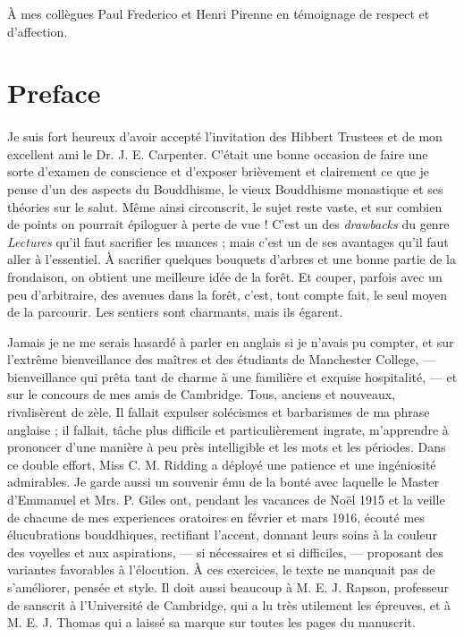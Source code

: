 \documentclass[a4paper, 11pt, oneside, english]{article}
\begin{document}
\setlength{\parskip}{1mm plus1mm minus1mm}
\clearpage
\tableofcontents
\clearpage
\vspace*{\fill}
\begin{center}\footnotesize
À mes collègues Paul Frederico et Henri Pirenne en témoignage de respect et d'affection.
\end{center}
\vspace*{\fill} 
\clearpage
\section*{Preface}
\paragraph{}
Je suis fort heureux d'avoir accepté l'invitation des Hibbert Trustees et de mon excellent ami le Dr. J. E. Carpenter. C'était une bonne occasion de faire une sorte d'examen de conscience et d'exposer brièvement et clairement ce que je pense d'un des aspects du Bouddhisme, le vieux Bouddhisme monastique et ses théories sur le salut. Même ainsi circonscrit, le sujet reste vaste, et sur combien de points on pourrait épiloguer à perte de vue ! C'est un des \emph{drawbacks} du genre \emph{Lectures} qu'il faut sacrifier les nuances ; mais c'est un de ses avantages qu'il faut aller à l'essentiel. À sacrifier quelques bouquets d'arbres et une bonne partie de la frondaison, on obtient une meilleure idée de la forêt. Et couper, parfois avec un peu d'arbitraire, des avenues dans la forêt, c'est, tout compte fait, le seul moyen de la parcourir. Les sentiers sont charmants, mais ils égarent.

Jamais je ne me serais hasardé à parler en anglais si je n'avais pu compter, et sur l'extrême bienveillance des maîtres et des étudiants de Manchester College, --- bienveillance qui prêta tant de charme à une familière et exquise hospitalité, --- et sur le concours de mes amis de Cambridge. Tous, anciens et nouveaux, rivalisèrent de zèle. Il fallait expulser solécismes et barbarismes de ma phrase anglaise ; il fallait, tâche plus difficile et particulièrement ingrate, m'apprendre à prononcer d'une manière à peu près intelligible et les mots et les périodes. Dans ce double effort, Miss C. M. Ridding a déployé une patience et une ingéniosité admirables. Je garde aussi un souvenir ému de la bonté avec laquelle le Master d'Emmanuel et Mrs. P. Giles ont, pendant les vacances de Noël 1915 et la veille de chacune de mes experiences oratoires en février et mars 1916, écouté mes élucubrations bouddhiques, rectifiant l'accent, donnant leurs soins à la couleur des voyelles et aux aspirations, --- si nécessaires et si difficiles, --- proposant des variantes favorables à l'élocution. À ces exercices, le texte ne manquait pas de s'améliorer, pensée et style. Il doit aussi beaucoup à M. E. J. Rapson, professeur de sanscrit à l'Université de Cambridge, qui a lu très utilement les épreuves, et à M. E. J. Thomas qui a laissé sa marque sur toutes les pages du manuscrit.
\end{document}
